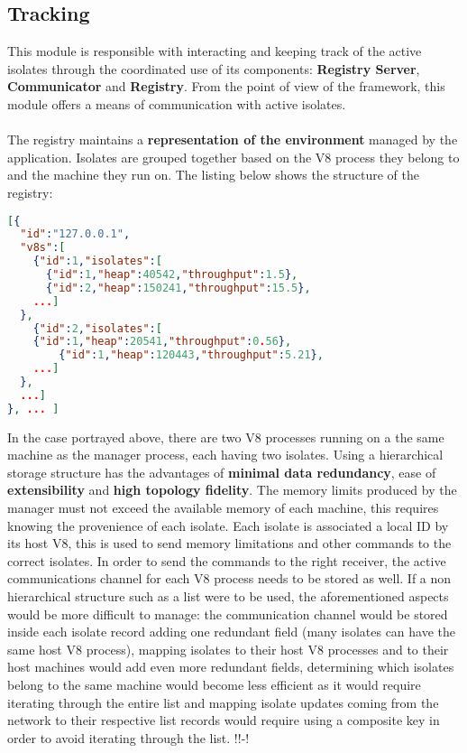 \documentclass{l4proj}
\begin{document}
\subsection{Tracking} \label{Design:Tracking}
\hspace*{3em} This module is responsible with interacting and keeping track of the active isolates through the coordinated use of its components: \textbf{Registry Server}, \textbf{Communicator} and \textbf{Registry}. From the point of view of the framework, this module offers a means of communication with active isolates.
\\\\ %
\hspace*{3em} The registry maintains a \textbf{representation of the environment} managed by the application. Isolates are grouped together based on the V8 process they belong to and the machine they run on. The listing below shows the structure of the registry:
\begin{lstlisting}[language=json,firstnumber=1]
[{
  "id":"127.0.0.1",
  "v8s":[
    {"id":1,"isolates":[
      {"id":1,"heap":40542,"throughput":1.5},
      {"id":2,"heap":150241,"throughput":15.5},
    ...]
  },
    {"id":2,"isolates":[
    {"id":1,"heap":20541,"throughput":0.56},
        {"id":1,"heap":120443,"throughput":5.21},
    ...]
  },
  ...]
}, ... ]
\end{lstlisting}
In the case portrayed above, there are two V8 processes running on a the same machine as the manager process, each having two isolates. Using a hierarchical storage structure has the advantages of \textbf{minimal data redundancy}, ease of \textbf{extensibility} and \textbf{high topology fidelity}. The memory limits produced by the manager must not exceed the available memory of each machine, this requires knowing the provenience of each isolate. Each isolate is associated a local ID by its host V8, this is used to send memory limitations and other commands to the correct isolates. In order to send the commands to the right receiver, the active communications channel for each V8 process needs to be stored as well. If a non hierarchical structure such as a list were to be used, the aforementioned aspects would be more difficult to manage: the communication channel would be stored inside each isolate record adding one redundant field (many isolates can have the same host V8 process), mapping isolates to their host V8 processes and to their host machines would add even more redundant fields, determining which isolates belong to the same machine would become less efficient as it would require iterating through the entire list and mapping isolate updates coming from the network to their respective list records would require using a composite key in order to avoid iterating through the list. !!-!
\end{document}
